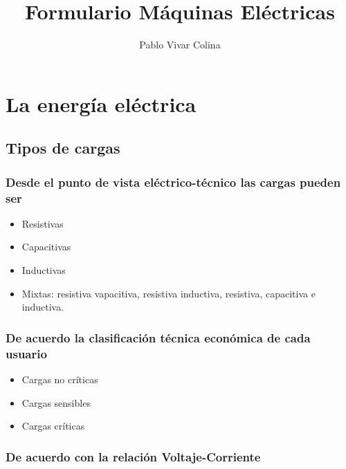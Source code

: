 \documentclass[]{article}
\title{Formulario Máquinas Eléctricas}
\author{Pablo Vivar Colina}
\begin{document}
	

\maketitle





\section{La energía eléctrica}

\subsection{Tipos de cargas}

\subsubsection{Desde el punto de vista eléctrico-técnico las cargas pueden ser}

\begin{itemize}
	\item Resistivas
	\item Capacitivas
	\item Inductivas
	\item Mixtas: resistiva vapacitiva, resistiva inductiva, resistiva, capacitiva e inductiva.
\end{itemize}


\subsubsection{De acuerdo la clasificación técnica económica de cada usuario}

\begin{itemize}
	\item Cargas no críticas
	\item Cargas sensibles
	\item Cargas críticas
	
\end{itemize}

\subsubsection{De acuerdo con la relación Voltaje-Corriente}
\end{document}
